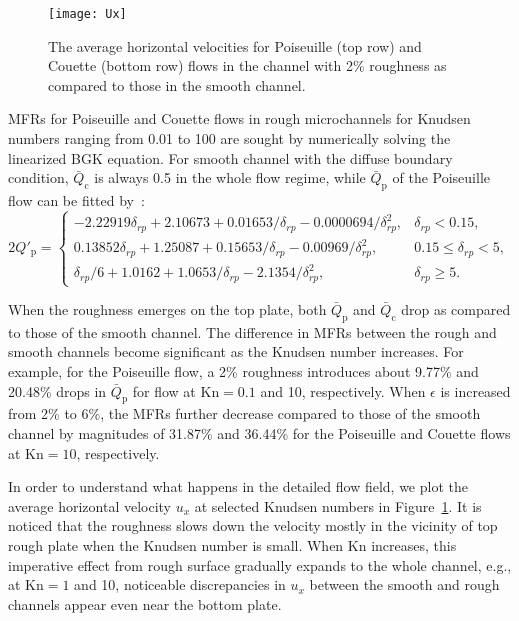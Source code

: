 \begin{figure}[t]
	\centering
	\texttt{[image: Ux]}
	\caption{The average horizontal velocities for Poiseuille (top row) and Couette (bottom row) flows in the channel with 2\% roughness as compared to those in the smooth channel. }
	\label{Ux}
\end{figure}

MFRs for Poiseuille and Couette flows in rough microchannels for Knudsen numbers ranging from 0.01 to 100 are sought by numerically solving the linearized BGK equation. For smooth channel with the diffuse boundary condition, $\bar{Q}_\text{c}$ is always 0.5 in the whole flow regime, while $\bar{Q}_\text{p}$ of the Poiseuille flow can be fitted by~\cite{Fukui1990}:
	\begin{equation}
	2Q'_\text{p}=\begin{cases}
	-2.22919\delta_{rp}+2.10673+0.01653/\delta_{rp}-0.0000694/\delta_{rp}^2, & \delta_{rp}<0.15,\\
	0.13852\delta_{rp}+1.25087+0.15653/\delta_{rp}-0.00969/\delta_{rp}^2, & 0.15\le\delta_{rp}<5,\\
	\delta_{rp}/6+1.0162+1.0653/\delta_{rp}-2.1354/\delta_{rp}^2, & \delta_{rp}\ge5.
	\end{cases}
	\label{FK}
	\end{equation}

When the roughness emerges on the top plate, both $\bar{Q}_\text{p}$ and $\bar{Q}_\text{c}$ drop as compared to those of the smooth channel. The difference in MFRs between the rough and smooth channels become significant as the Knudsen number increases. For example, for the Poiseuille flow, a 2\% roughness introduces about 9.77\% and 20.48\% drops in $\bar{Q}_\text{p}$ for flow at $\text{Kn}=0.1$ and 10, respectively. When $\epsilon$ is increased from 2\% to 6\%, the MFRs further decrease compared to those of the smooth channel by magnitudes of 31.87\% and 36.44\% for the Poiseuille and Couette flows at $\text{Kn}=10$, respectively.

In order to understand what happens in the detailed flow field, we plot the average horizontal velocity $u_x$ at selected Knudsen numbers in Figure~\ref{Ux}. It is noticed that the roughness slows down the velocity mostly in the vicinity of top rough plate when the Knudsen number is small. When $\text{Kn}$ increases, this imperative effect from rough surface gradually expands to the whole channel, e.g., at $\text{Kn}=1$ and 10, noticeable discrepancies in $u_x$ between the smooth and rough channels appear even near the bottom plate. 


